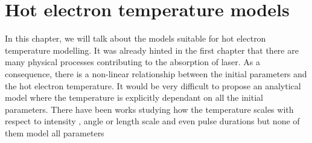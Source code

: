 \chapter{Hot electron temperature models}
In this chapter, we will talk about the models suitable for hot electron temperature modelling. It was already hinted in the first chapter that there are many physical processes contributing to the absorption of laser. As a consequence, there is a non-linear relationship between the initial parameters and the hot electron temperature. It would be very difficult to propose an analytical model where the temperature is explicitly dependant on all the initial parameters. There have been works studying how the temperature scales with respect to intensity \cite{kluge2011,cui2013,miller2023, haines2009, beg1997}, angle \cite{cui2013} or length scale and even pulse durations \cite{miller2023} but none of them model all parameters